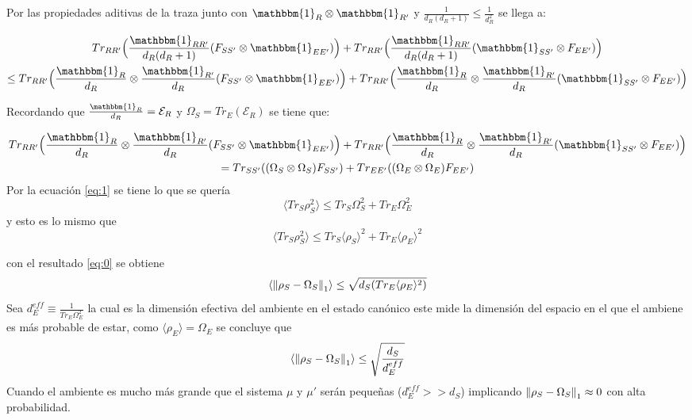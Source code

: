Por las propiedades aditivas de la traza junto con $\mathbbm{1}_{R} \otimes \mathbbm{1}_{R'}$  y $\frac{1}{d_{R}(d_{R}+1)} \le \frac{1}{d_{R}^{2}}$ se llega a:

\begin{multline}

Tr_{RR'} \Big( \frac{\mathbbm{1}_{RR'}}{d_{R}(d_{R}+1)}(F_{SS'} \otimes \mathbbm{1}_{EE'}) \Big) + Tr_{RR'} \Big( \frac{\mathbbm{1}_{RR'}}{d_{R}(d_{R}+1)} (\mathbbm{1}_{SS'} \otimes F_{EE'})  \Big)\\
\le Tr_{RR'}\Big(\frac{\mathbbm{1}_{R}}{d_{R}} \otimes \frac{\mathbbm{1}_{R'}}{d_{R}} (F_{SS'} \otimes \mathbbm{1}_{EE'}) \Big) + Tr_{RR'}\Big(\frac{\mathbbm{1}_{R}}{d_{R}} \otimes \frac{\mathbbm{1}_{R'}}{d_{R}} (\mathbbm{1}_{SS'}\otimes 	F_{EE'}) \Big)
\end{multline}


Recordando que $\frac{\mathbbm{1}_{R}}{d_{R}}= \mathcal{E}_{R}$ y $\Omega_{S}=Tr_{E}(\mathcal{E}_{R})$ se tiene que:

\begin{multline}
Tr_{RR'}\Big(\frac{\mathbbm{1}_{R}}{d_{R}} \otimes \frac{\mathbbm{1}_{R'}}{d_{R}} (F_{SS'} \otimes 		\mathbbm{1}_{EE'}) \Big) + Tr_{RR'}\Big(\frac{\mathbbm{1}_{R}}{d_{R}} \otimes \frac{\mathbbm{1}_{R'}}{d_{R}} (\mathbbm{1}_{SS'}\otimes 	F_{EE'}) \Big) \notag \\
 = Tr_{SS'}((\Omega_{S} \otimes \Omega_{S})F_{SS'}) + Tr_{EE'}((\Omega_{E} \otimes \Omega_{E})F_{EE'})
\end{multline}
Por la ecuación \ref{eq:1} se tiene lo que se quería
\begin{equation}
\langle Tr_{S} \rho_{S}^{2} \rangle \le Tr_{S} \Omega_{S}^{2} +Tr_{E} \Omega_{E}^{2}
\end{equation}
y esto es lo mismo que 
\begin{equation}
\langle Tr_{S} \rho_{S}^{2} \rangle \le Tr_{S} \langle \rho_{S} \rangle ^{2}  + Tr_{E} \langle \rho_{E}\rangle^{2}
\end{equation}

con el resultado \ref{eq:0} se obtiene
\begin{equation}
\langle \norm{\rho_{S} -\Omega_{S}}_{1} \rangle \le \sqrt{d_{S}(Tr_{E} \langle \rho_{E} \rangle^{2})}
\end{equation}
Sea $d_{E}^{eff} \equiv \frac{1}{Tr_{E} \Omega_{E}^{2}}$ la cual es la dimensión efectiva del ambiente en el estado canónico este mide la dimensión del espacio en el que el ambiene es más probable de estar, como $\langle \rho_{E} \rangle = \Omega_{E}$ se concluye que 
\begin{equation}
\langle \norm{\rho_{S} -\Omega_{S}}_{1} \rangle \le \sqrt{\frac{d_{S}}{d_{E}^{eff}}}
\end{equation}
Cuando  el ambiente es mucho más grande que el sistema $\mu$ y $\mu'$ serán pequeñas ($d_{E}^{eff}>>d_{S}$) implicando $\norm{\rho_{S} -\Omega_{S}}_{1} \approx 0$ con alta probabilidad.



